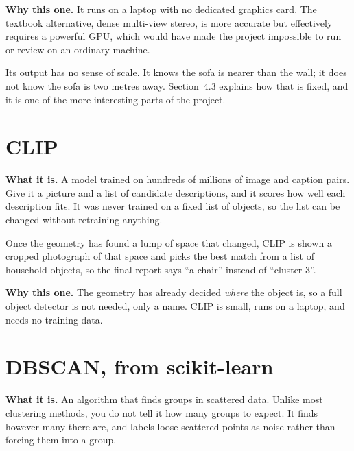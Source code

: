 \textbf{Why this one.} It runs on a laptop with no dedicated graphics card. The textbook
alternative, dense multi-view stereo, is more accurate but effectively requires a powerful GPU,
which would have made the project impossible to run or review on an ordinary machine.

\begin{watch}
Its output has no sense of scale. It knows the sofa is nearer than the wall; it does not know the
sofa is two metres away. Section~4.3 explains how that is fixed, and it is one of the more
interesting parts of the project.
\end{watch}

\section{CLIP}

\begin{plainbox}
\textbf{What it is.} A model trained on hundreds of millions of image and caption pairs. Give it a
picture and a list of candidate descriptions, and it scores how well each description fits. It was
never trained on a fixed list of objects, so the list can be changed without retraining anything.
\end{plainbox}

\begin{project}
Once the geometry has found a lump of space that changed, CLIP is shown a cropped photograph of
that space and picks the best match from a list of household objects, so the final report says
``a chair'' instead of ``cluster 3''.
\end{project}

\textbf{Why this one.} The geometry has already decided \emph{where} the object is, so a full
object detector is not needed, only a name. CLIP is small, runs on a laptop, and needs no training
data.

\section{DBSCAN, from scikit-learn}

\begin{plainbox}
\textbf{What it is.} An algorithm that finds groups in scattered data. Unlike most clustering
methods, you do not tell it how many groups to expect. It finds however many there are, and labels
loose scattered points as noise rather than forcing them into a group.
\end{plainbox}

